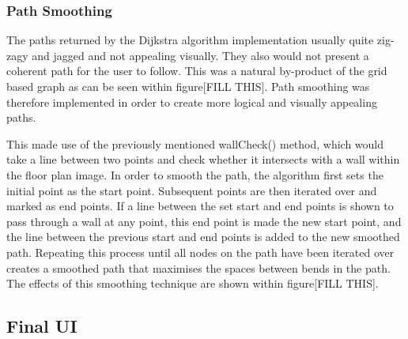 \documentclass[main.tex]{subfiles}
\begin{document}
\subsubsection{Path Smoothing}

The paths returned by the Dijkstra algorithm implementation usually quite zig-zagy and jagged and not appealing visually. They also would not present a coherent path for the user to follow. This was a natural by-product of the grid based graph as can be seen within figure[FILL THIS]. Path smoothing was therefore implemented in order to create more logical and visually appealing paths.

This made use of the previously mentioned wallCheck() method, which would take a line between two points and check whether it intersects with a wall within the floor plan image. In order to smooth the path, the algorithm first sets the initial point as the start point. Subsequent points are then iterated over and marked as end points. If a line between the set start and end points is shown to pass through a wall at any point, this end point is made the new start point, and the line between the previous start and end points is added to the new smoothed path. Repeating this process until all nodes on the path have been iterated over creates a smoothed path that maximises the spaces between bends in the path. The effects of this smoothing technique are shown within figure[FILL THIS].

\subsection{Final UI}
\end{document}
